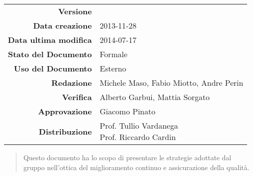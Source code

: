 

\newcommand{\Versione}{\versionePianoDiQualifica{}}	%
\newcommand{\Data}{2013-11-28}						%
\newcommand{\DataUltimaModifica}{2014-07-17}
\newcommand{\TipoDocumento}{Piano di Qualifica}		%





\begin{center}
\begin{tabular}{r|l}
\textbf{Versione} & \Versione{} \\
\textbf{Data creazione} & \Data{} \\
\textbf{Data ultima modifica} & \DataUltimaModifica{} \\
\textbf{Stato del Documento} & Formale \\		%
\textbf{Uso del Documento} & Esterno \\			%
\textbf{Redazione} & Michele Maso, Fabio Miotto, Andre Perin\\			%
\textbf{Verifica} & Alberto Garbui, Mattia Sorgato\\%
\textbf{Approvazione} & Giacomo Pinato\\				%
\textbf{Distribuzione} & \parbox[t]{4cm}{Prof. Tullio Vardanega \\ Prof. Riccardo Cardin \\ \Prop{} }
\end{tabular}
\end{center}

\vspace{0.05in}

\begin{abstract}
\begin{center}
Questo documento ha lo scopo di presentare le strategie adottate dal gruppo \NomeGruppo{} nell'ottica del miglioramento continuo e assicurazione della qualità.
\end{center}
\end{abstract}

